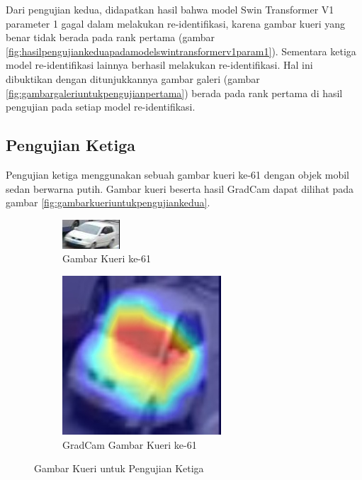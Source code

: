 Dari pengujian kedua, didapatkan hasil bahwa model Swin Transformer V1 parameter 1 gagal dalam melakukan re-identifikasi, 
karena gambar kueri yang benar tidak berada pada rank pertama (gambar 
\ref{fig:hasilpengujiankeduapadamodelswintransformerv1param1}). Sementara ketiga model re-identifikasi lainnya berhasil 
melakukan re-identifikasi. Hal ini dibuktikan dengan ditunjukkannya gambar galeri (gambar \ref{fig:gambargaleriuntukpengujianpertama})
berada pada rank pertama di hasil pengujian pada setiap model re-identifikasi.

\subsection{Pengujian Ketiga}

Pengujian ketiga menggunakan sebuah gambar kueri ke-61 dengan objek mobil sedan berwarna putih. Gambar kueri 
beserta hasil GradCam dapat dilihat pada gambar \ref{fig:gambarkueriuntukpengujiankedua}.

\begin{figure}[h!]
  \centering
  \begin{subfigure}{.5\textwidth}
    \centering
    \includegraphics[width=.4\linewidth]{gambar/Que61_1120.jpg}
    \caption{Gambar Kueri ke-61}
    \label{gambarkuerinomorenamsatu}
  \end{subfigure}%
  \begin{subfigure}{.5\textwidth}
    \centering
    \includegraphics[width=.4\linewidth]{gambar/GradCamQue61_1120.jpg}
    \caption{GradCam Gambar Kueri ke-61}
    \label{gradcamgambarkuerinomorenamsatu}
  \end{subfigure}
  \caption{Gambar Kueri untuk Pengujian Ketiga}
  \label{fig:gambarkueriuntukpengujianketiga}
\end{figure}

